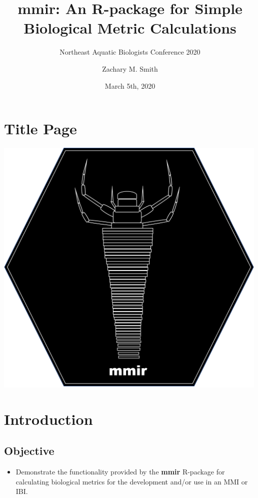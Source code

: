 \documentclass[
]{book}
\title{mmir: An R-package for Simple Biological Metric Calculations}
\subtitle{Northeast Aquatic Biologists Conference 2020}
\author{Zachary M. Smith}
\date{March 5th, 2020}
\providecommand{\tightlist}{%
  \setlength{\itemsep}{0pt}\setlength{\parskip}{0pt}}
\begin{document}
\maketitle

{
\setcounter{tocdepth}{1}
\tableofcontents
}
\hypertarget{title-page}{%
\chapter{Title Page}\label{title-page}}

\includegraphics[width=5.20833in,height=\textheight]{images/mmir_hex-sticker.png}

\hypertarget{introduction}{%
\chapter{Introduction}\label{introduction}}

\hypertarget{objective}{%
\section{Objective}\label{objective}}

\begin{itemize}
\tightlist
\item
  Demonstrate the functionality provided by the \textbf{mmir} R-package for calculating biological metrics for the development and/or use in an MMI or IBI.
\end{itemize}
\end{document}
